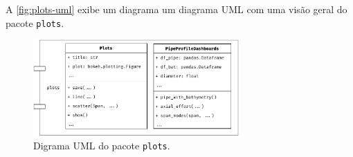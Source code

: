 A \autoref{fig:plots-uml} exibe um diagrama um diagrama UML com uma visão geral do pacote \texttt{plots}.

\begin{figure}[!ht]
    \centering
    \caption{Digrama UML do pacote \texttt{plots}.}\label{fig:plots-uml}
    \includegraphics[width=0.7\textwidth]{imagens/plots-uml}
\end{figure}